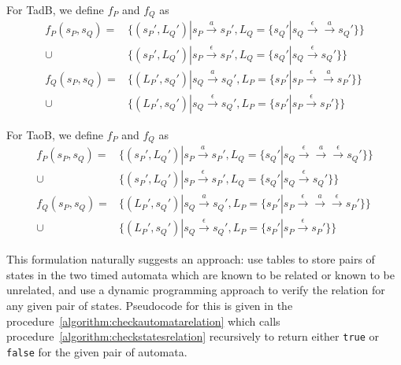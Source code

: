 \documentclass[a4paper]{llncs}
\begin{document}
For TadB, we define $f_P$ and $f_Q$ as
\begin{align*}
  f_P(s_P, s_Q) = & \{(s_P', L_Q') | s_P \xrightarrow{a} s_P', 
  L_Q=\{ s_Q' | s_Q \xrightarrow{\epsilon}\xrightarrow{a} s_Q'\}\} \\
  \cup & \{(s_P', L_Q') | s_P \xrightarrow{\epsilon} s_P', 
  L_Q=\{ s_Q' | s_Q \xrightarrow{\epsilon} s_Q'\}\} \\
  f_Q(s_P, s_Q) = & \{(L_P', s_Q') | s_Q \xrightarrow{a} s_Q', 
  L_P=\{ s_P' | s_P \xrightarrow{\epsilon}\xrightarrow{a} s_P'\}\} \\
  \cup & \{(L_P', s_Q') | s_Q \xrightarrow{\epsilon} s_Q', 
  L_P=\{ s_P' | s_P \xrightarrow{\epsilon} s_P'\}\} 
\end{align*}

For TaoB, we define $f_P$ and $f_Q$ as
\begin{align*}
  f_P(s_P, s_Q) = & \{(s_P', L_Q') | s_P \xrightarrow{a} s_P', 
  L_Q=\{ s_Q' | s_Q \xrightarrow{\epsilon}\xrightarrow{a}\xrightarrow{\epsilon} s_Q'\}\} \\
  \cup & \{(s_P', L_Q') | s_P \xrightarrow{\epsilon} s_P', 
  L_Q=\{ s_Q' | s_Q \xrightarrow{\epsilon} s_Q'\}\} \\
  f_Q(s_P, s_Q) = & \{(L_P', s_Q') | s_Q \xrightarrow{a} s_Q', 
  L_P=\{ s_P' | s_P \xrightarrow{\epsilon}\xrightarrow{a}\xrightarrow{\epsilon} s_P'\}\} \\
  \cup & \{(L_P', s_Q') | s_Q \xrightarrow{\epsilon} s_Q', 
  L_P=\{ s_P' | s_P \xrightarrow{\epsilon} s_P'\}\} 
\end{align*}

This formulation naturally suggests an approach: use tables to store
pairs of states in the two timed automata which are known to be
related or known to be unrelated, and use a dynamic programming
approach to verify the relation for any given pair of
states. Pseudocode for this is given in the
procedure~\ref{algorithm:checkautomatarelation} which calls
procedure~\ref{algorithm:checkstatesrelation} recursively to return
either \texttt{true} or \texttt{false} for the given pair of automata.
\end{document}
